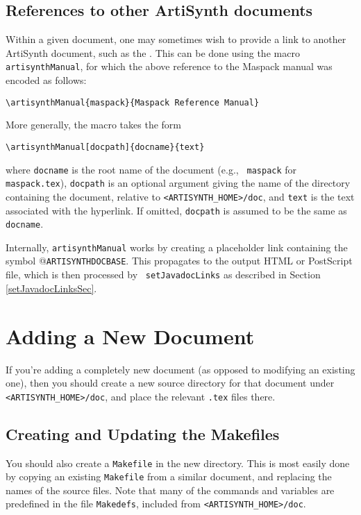 \documentclass{article}
\begin{document}
\subsection{References to other ArtiSynth documents}

Within a given document, one may sometimes wish to provide a link to another
ArtiSynth document, such as the
. 
This can be done using the macro {\tt \BKS artisynthManual},
for which the above reference to the Maspack manual was 
encoded as follows:
%
\begin{lstlisting}[]
  \artisynthManual{maspack}{Maspack Reference Manual}
\end{lstlisting}
%
More generally, the macro takes the form
%
\begin{lstlisting}[]
  \artisynthManual[docpath]{docname}{text}
\end{lstlisting}
%
where {\tt docname} is the root name of the document (e.g., {\tt
maspack} for {\tt maspack.tex}), {\tt docpath} is an optional argument
giving the name of the directory containing the document, relative to
{\tt <ARTISYNTH\_HOME>/doc}, and {\tt text} is the text associated
with the hyperlink. If omitted, {\tt docpath} is assumed to be the
same as {\tt docname}.

Internally, {\tt \BKS artisynthManual} works by creating a placeholder
link containing the symbol @{\tt ARTISYNTHDOCBASE}. This propagates to
the output HTML or PostScript file, which is then processed by {\tt
setJavadocLinks} as described in Section \ref{setJavadocLinksSec}.

\section{Adding a New Document}

If you're adding a completely new document (as opposed
to modifying an existing one), then you should create a
new source directory for that document under {\tt <ARTISYNTH\_HOME>/doc},
and place the relevant {\tt .tex} files there.

\subsection{Creating and Updating the Makefiles}

You should also create a {\tt Makefile} in the new directory. This is most
easily done by copying an existing {\tt Makefile} from a similar document,
and replacing the names of the source files. 
Note that many of the commands
and variables are predefined in the file {\tt Makedefs}, included from
{\tt <ARTISYNTH\_HOME>/doc}.
\end{document}
